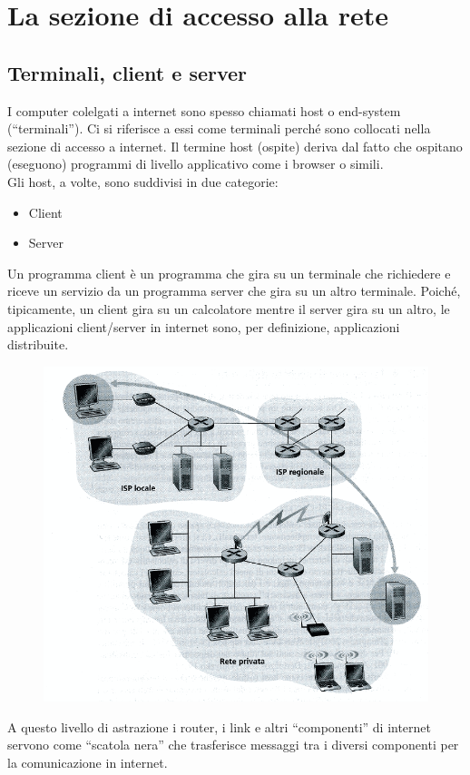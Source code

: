 \documentclass[11pt,a4paper]{book}
\begin{document}
\section{La sezione di accesso alla rete}
\subsection{Terminali, client e server}
I computer colelgati a internet sono spesso chiamati host o end-system (“terminali”). Ci si riferisce a essi come terminali perché sono collocati nella sezione di accesso a internet. Il termine host (ospite) deriva dal fatto che ospitano (eseguono) programmi di livello applicativo come i browser o simili. \\
Gli host, a volte, sono suddivisi in due categorie:
\begin{itemize}
	\item Client
	\item Server
\end{itemize}
Un programma client è un programma che gira su un terminale che richiedere e riceve un servizio da un programma server che gira su un altro terminale.
Poiché, tipicamente, un client gira su un calcolatore mentre il server gira su un altro, le applicazioni client/server in internet sono, per definizione, applicazioni distribuite.
\begin{figure}
	\begin{center}
		\includegraphics[scale=0.6]{img/001.png}
	\end{center}
\end{figure}
A questo livello di astrazione i router, i link e altri “componenti” di internet servono come “scatola nera” che trasferisce messaggi tra i diversi componenti per la comunicazione in internet.
\end{document}
